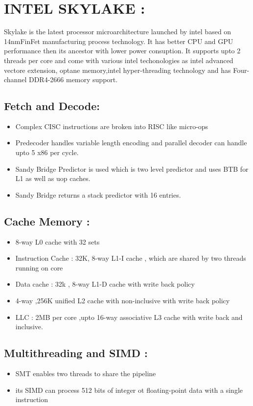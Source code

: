 \documentclass[a4paper,10pt]{article}
\begin{document}
\section{INTEL SKYLAKE :}
Skylake is the latest processor microarchitecture launched  by intel based on 14nmFinFet manufacturing process technology. It has better CPU and GPU performance then its ancestor with lower power consuption. It supports upto 2 threads per core and come with various intel techonologies as intel advanced vectore extension, optane memory,intel hyper-threading technology and has Four-channel DDR4-2666 memory support.

\subsection{Fetch and Decode: }
\begin{itemize}
 \item  Complex CISC instructions are broken into RISC like micro-ops
 \item  Predecoder handles variable length encoding and parallel decoder can handle upto 5 x86 per cycle.
 \item Sandy Bridge Predictor is used which is two level predictor and uses BTB for L1 as well as uop caches.
 \item Sandy Bridge returns a stack predictor with 16 entries.
\end{itemize}

\subsection{Cache Memory :}
\begin{itemize}
 \item 8-way L0 cache with 32 sets
 \item Instruction Cache : 32K, 8-way L1-I cache , which are shared by two threads running on core
 \item  Data cache : 32k , 8-way L1-D cache with write back policy
 \item 4-way ,256K unified L2 cache with non-inclusive with write back policy
 \item LLC : 2MB per core ,upto 16-way associative L3 cache with write back and inclusive.
\end{itemize}

\subsection{ Multithreading and SIMD : }
\begin{itemize}
 \item SMT enables two threads to share the pipeline
 \item its SIMD can process 512 bits of integer ot floating-point data with a single instruction
\end{itemize}
\end{document}
